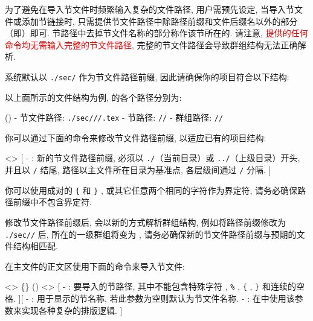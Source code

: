 
为了避免在导入节文件时频繁输入复杂的文件路径, 用户需预先设定, 当导入节文件或添加节链接时, 只需提供节文件路径中除路径前缀和文件后缀名以外的部分（即）即可. 节路径中去掉节文件名称的部分称作该节所在的. 请注意, \textcolor{red}{\SimpleSystemTeX 提供的任何命令均无需输入完整的节文件路径}, 完整的节文件路径会导致群组结构无法正确解析.

系统默认以 \texttt{./sec/} 作为节文件路径前缀, 因此请确保你的项目符合以下结构:

\medskip{}\medskip

以上面所示的文件结构为例,  的各个路径分别为:

(){
    - 节文件路径: \texttt{./sec///.tex}
    - 节路径: \texttt{//}
    - 群组路径: \texttt{//}
}

你可以通过下面的命令来修改节文件路径前缀, 以适应已有的项目结构:

<>{
}[
    -  : 新的节文件路径前缀, 必须以 \texttt{./}（当前目录）或 \texttt{../}（上级目录）开头, 并且以 \texttt{/} 结尾, 路径以主文件所在目录为基准点, 各层级间通过 \texttt{/} 分隔.
]

你可以使用成对的 \texttt{\{} 和 \texttt{\}} , 或其它任意两个相同的字符作为界定符, 请务必确保路径前缀中不包含界定符.

修改节文件路径前缀后, \SimpleSystemTeX 会以新的方式解析群组结构, 例如将路径前缀修改为 \texttt{./sec//} 后,  所在的一级群组将变为  , 请务必确保新的节文件路径前缀与预期的文件结构相匹配.

在主文件的正文区使用下面的命令来导入节文件:

<>{
    \{\}
    ()
    <>
}[
    -  : 要导入的节路径, 其中不能包含特殊字符 \texttt{\cs{}} , \texttt{\%} , \texttt{\{} , \texttt{\}} 和连续的空格.
][
    -  : 用于显示的节名称, 若此参数为空则默认为节文件名称.
    -  : 在中使用该参数来实现各种复杂的排版逻辑.
]

